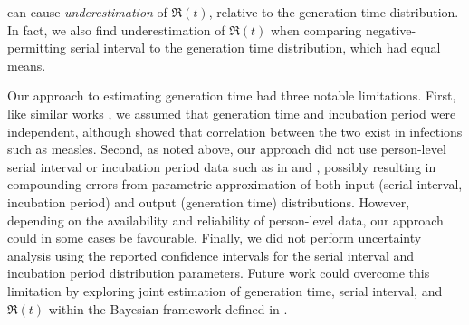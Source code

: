 can cause \emph{underestimation} of $\Re(t)$, relative to the generation time distribution.
In fact, we also find underestimation of $\Re(t)$ when comparing
negative-permitting serial interval to the generation time distribution,
which had equal means.
\par
Our approach to estimating generation time had three notable limitations.
First, like similar works \cite{Kuk2005,Ganyani2020}, we assumed that
generation time and incubation period were independent,
although \textcite{Klinkenberg2011} showed that
correlation between the two exist in infections such as measles.
Second, as noted above, our approach did not use
person-level serial interval or incubation period data
such as in \cite{Ganyani2020} and \cite{Klinkenberg2011},
possibly resulting in compounding errors from
parametric approximation of both input (serial interval, incubation period)
and output (generation time) distributions.
However, depending on the availability and reliability of person-level data,
our approach could in some cases be favourable.
Finally, we did not perform uncertainty analysis using
the reported confidence intervals for
the serial interval and incubation period distribution parameters.
Future work could overcome this limitation by exploring
joint estimation of generation time, serial interval, and $\Re(t)$
within the Bayesian framework defined in \cite{Cori2013}.